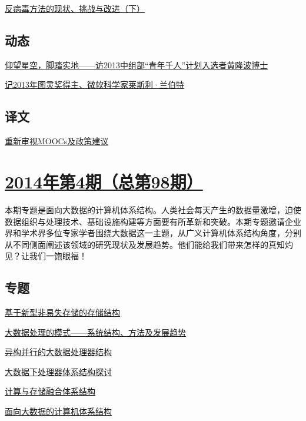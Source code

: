 \documentclass[a4paper]{article}
\begin{document}
\href{http://history.ccf.org.cn/resources/1190201776262/2014/05/12/10.pdf}{反病毒方法的现状、挑战与改进（下）}

\subsection{动态}
\href{http://history.ccf.org.cn/resources/1190201776262/2014/05/12/12.pdf}{仰望星空，脚踏实地——访2013中组部“青年千人”计划入选者黄隆波博士}

\href{http://history.ccf.org.cn/resources/1190201776262/2014/05/12/13.pdf}{记2013年图灵奖得主、微软科学家莱斯利·兰伯特}

\subsection{译文}
\href{http://history.ccf.org.cn/resources/1190201776262/2014/05/12/14.pdf}{重新审视MOOCs及政策建议}


\section{\href{http://history.ccf.org.cn/sites/ccf/jsjtbbd.jsp?contentId=2794320049848}{\textbf{2014年第4期（总第98期）}}}
本期专题是面向大数据的计算机体系结构。人类社会每天产生的数据量激增，迫使数据组织与处理技术、基础设施构建等方面要有所革新和突破。本期专题邀请企业界和学术界多位专家学者围绕大数据这一主题，从广义计算机体系结构角度，分别从不同侧面阐述该领域的研究现状及发展趋势。他们能给我们带来怎样的真知灼见？让我们一饱眼福！
\subsection{专题}
\href{http://history.ccf.org.cn/resources/1190201776262/2014/04/11/3.pdf}{基于新型非易失存储的存储结构}

\href{http://history.ccf.org.cn/resources/1190201776262/2014/04/11/5.pdf}{大数据处理的模式——系统结构、方法及发展趋势}

\href{http://history.ccf.org.cn/resources/1190201776262/2014/04/11/1.pdf}{异构并行的大数据处理器结构}

\href{http://history.ccf.org.cn/resources/1190201776262/2014/04/11/2.pdf}{大数据下处理器体系结构探讨}

\href{http://history.ccf.org.cn/resources/1190201776262/2014/04/11/4.pdf}{计算与存储融合体系结构}

\href{http://history.ccf.org.cn/resources/1190201776262/2014/04/11/0.pdf}{面向大数据的计算机体系结构}
\end{document}
